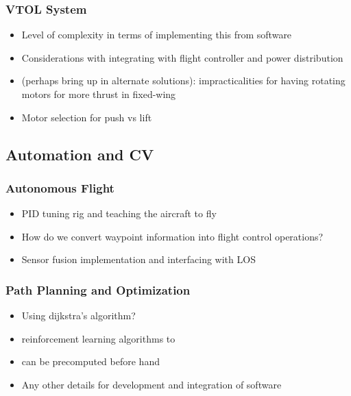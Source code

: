 \subsubsection{VTOL System}


\begin{itemize}
	\item Level of complexity in terms of implementing this from software
	\item Considerations with integrating with flight controller and power
		distribution
	\item (perhaps bring up in alternate solutions): impracticalities for
		having rotating motors for more thrust in fixed-wing
	\item Motor selection for push vs lift
\end{itemize}


%
%

\subsection{Automation and CV}


\subsubsection{Autonomous Flight}


\begin{itemize}
	\item PID tuning rig and teaching the aircraft to fly
	\item How do we convert waypoint information into flight control operations?
	\item Sensor fusion implementation and interfacing with LOS
\end{itemize}

\subsubsection{Path Planning and Optimization}


\begin{itemize}
	\item Using dijkstra's algorithm?
	\item reinforcement learning algorithms to 
	\item can be precomputed before hand
	\item Any other details for development and integration of software
\end{itemize}

